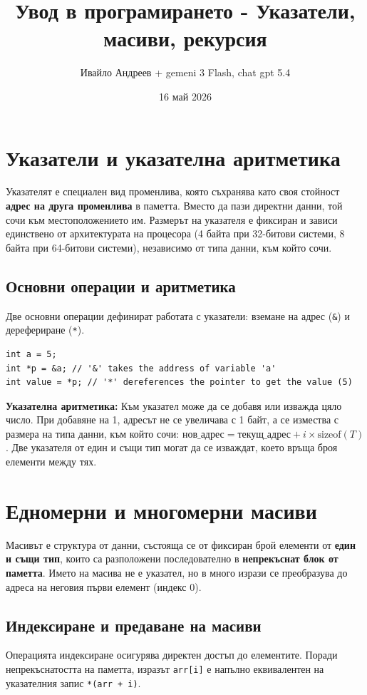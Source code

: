 \documentclass{scrartcl}
\title{Увод в програмирането - Указатели, масиви, рекурсия}
\author{Ивайло Андреев + gemeni 3 Flash, chat gpt 5.4}
\date{16 май 2026}
\begin{document}
\maketitle

\tableofcontents

\newpage

\begin{FlushLeft}

\section{Указатели и указателна аритметика}
Указателят е специален вид променлива, която съхранява като своя стойност \textbf{адрес на друга променлива} в паметта. Вместо да пази директни данни, той сочи към местоположението им. Размерът на указателя е фиксиран и зависи единствено от архитектурата на процесора (4 байта при 32-битови системи, 8 байта при 64-битови системи), независимо от типа данни, към който сочи.

\subsection{Основни операции и аритметика}
Две основни операции дефинират работата с указатели: вземане на адрес (\texttt{\&}) и дерефериране (\texttt{*}).
\begin{lstlisting}
int a = 5;
int *p = &a; // '&' takes the address of variable 'a'
int value = *p; // '*' dereferences the pointer to get the value (5)
\end{lstlisting}

\textbf{Указателна аритметика:} Към указател може да се добавя или изважда цяло число. При добавяне на 1, адресът не се увеличава с 1 байт, а се измества с размера на типа данни, към който сочи: $\text{нов\_адрес} = \text{текущ\_адрес} + i \times \text{sizeof}(T)$. Две указателя от един и същи тип могат да се изваждат, което връща броя елементи между тях.

\section{Едномерни и многомерни масиви}
Масивът е структура от данни, състояща се от фиксиран брой елементи от \textbf{един и същи тип}, които са разположени последователно в \textbf{непрекъснат блок от паметта}. Името на масива не е указател, но в много изрази се преобразува до адреса на неговия първи елемент (индекс 0).

\subsection{Индексиране и предаване на масиви}
Операцията индексиране осигурява директен достъп до елементите. Поради непрекъснатостта на паметта, изразът \texttt{arr[i]} е напълно еквивалентен на указателния запис \texttt{*(arr + i)}.


\end{FlushLeft}
\end{document}
